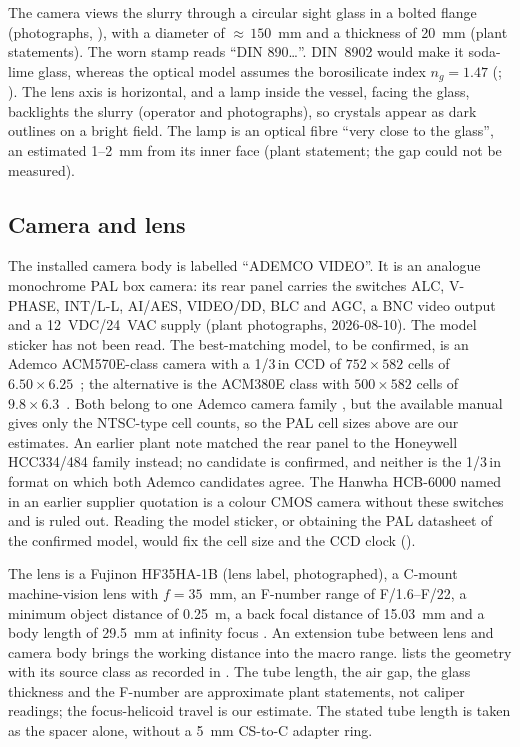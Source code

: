 The camera views the slurry through a circular sight glass in a bolted flange (photographs,
), with a diameter of ${\approx}\,150$~mm and a thickness of 20~mm (plant statements).
The worn stamp reads ``DIN 890\ldots''. DIN~8902 \citep{DIN8902} would make it soda-lime glass, whereas the optical
model assumes the borosilicate index $n_g = 1.47$ (\citealp{SchottBorofloat33}; ). The lens axis
is horizontal, and a lamp inside the vessel, facing the glass, backlights the slurry (operator and photographs), so
crystals appear as dark outlines on a bright field. The lamp is an optical fibre ``very close to the glass'', an
estimated 1--2~mm from its inner face (plant statement; the gap could not be measured).

\subsection{Camera and lens}\label{sec:camera}

The installed camera body is labelled ``ADEMCO VIDEO''. It is an analogue monochrome PAL box camera: its rear panel
carries the switches ALC, V-PHASE, INT/L-L, AI/AES, VIDEO/DD, BLC and AGC, a BNC video output and a 12~VDC/24~VAC
supply (plant photographs, 2026-08-10). The model sticker has not been read. The best-matching model, to be
confirmed, is an Ademco ACM570E-class camera with a 1/3\,in CCD of $752 \times 582$ cells of $6.50 \times 6.25$~\um;
the alternative is the ACM380E class with $500 \times 582$ cells of $9.8 \times 6.3$~\um. Both belong to one Ademco
camera family \citep{AdemcoACM380E}, but the available manual gives only the NTSC-type cell counts, so the PAL cell
sizes above are our estimates. An earlier plant note matched the rear panel to the Honeywell HCC334/484 family
instead; no candidate is confirmed, and neither is the 1/3\,in format on which both Ademco candidates agree. The
Hanwha HCB-6000 named in an earlier supplier quotation \citep{PolzQuote2025} is a
colour CMOS camera without these switches and is ruled out. Reading the model sticker, or obtaining the PAL
datasheet of the confirmed model, would fix the cell size and the CCD clock ().

The lens is a Fujinon HF35HA-1B (lens label, photographed), a C-mount machine-vision lens with $f = 35$~mm, an
F-number range of F/1.6--F/22, a minimum object distance of 0.25~m, a back focal distance of 15.03~mm and a body
length of 29.5~mm at infinity focus \citep{FujinonHF35HA1B}. An extension tube between lens and camera body brings
the working distance into the macro range.  lists the geometry with its source class as recorded
in . The tube length, the air gap, the glass thickness and the F-number are approximate
plant statements, not caliper readings; the focus-helicoid travel is our estimate. The stated tube length is taken
as the spacer alone, without a 5~mm CS-to-C adapter ring.

